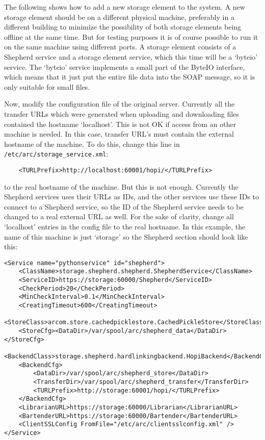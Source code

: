 \documentclass{article}
\begin{document}
The following shows how to add a new storage element to the system. A new storage element should be on a different physical machine, preferably in a different building to minimize the possibility of both storage elements being offline at the same time. But for testing purposes it is of course possible to run it on the same machine using different ports. A storage element consists of a Shepherd service and a storage element service, which this time will be a `byteio' service. The `byteio' service implements a small part of the ByteIO interface, which means that it just put the entire file data into the SOAP message, so it is only suitable for small files.

Now, modify the configuration file of the original server. Currently all the transfer URLs which were generated when uploading and downloading files contained the hostname `localhost'. This is not OK if access from an other machine is needed. In this case, transfer URL's must contain the external hostname of the machine. To do this, change this line in \verb!/etc/arc/storage_service.xml!:

\begin{verbatim}
    <TURLPrefix>http://localhost:60001/hopi/</TURLPrefix>
\end{verbatim}

to the real hostname of the machine. But this is not enough. Currently the Shepherd services uses their URLs as IDs, and the other services use these IDs to connect to a Shepherd service, so the ID of the Shepherd service needs to be changed to a real external URL as well. For the sake of clarity, change all `localhost' entries in the config file to the real hostname. In this example, the name of this machine is just `storage' so the Shepherd section should look like this:

\begin{verbatim}
<Service name="pythonservice" id="shepherd">
    <ClassName>storage.shepherd.shepherd.ShepherdService</ClassName>
    <ServiceID>https://storage:60000/Shepherd</ServiceID>
    <CheckPeriod>20</CheckPeriod>
    <MinCheckInterval>0.1</MinCheckInterval>
    <CreatingTimeout>600</CreatingTimeout>
    <StoreClass>arcom.store.cachedpicklestore.CachedPickleStore</StoreClass>
    <StoreCfg><DataDir>/var/spool/arc/shepherd_data</DataDir></StoreCfg>
    <BackendClass>storage.shepherd.hardlinkingbackend.HopiBackend</BackendClass>
    <BackendCfg>
        <DataDir>/var/spool/arc/shepherd_store</DataDir>
        <TransferDir>/var/spool/arc/shepherd_transfer</TransferDir>
        <TURLPrefix>http://storage:60001/hopi/</TURLPrefix>
    </BackendCfg>
    <LibrarianURL>https://storage:60000/Librarian</LibrarianURL>
    <BartenderURL>https://storage:60000/Bartender</BartenderURL>
    <ClientSSLConfig FromFile="/etc/arc/clientsslconfig.xml" />
</Service>
\end{verbatim}
\end{document}
